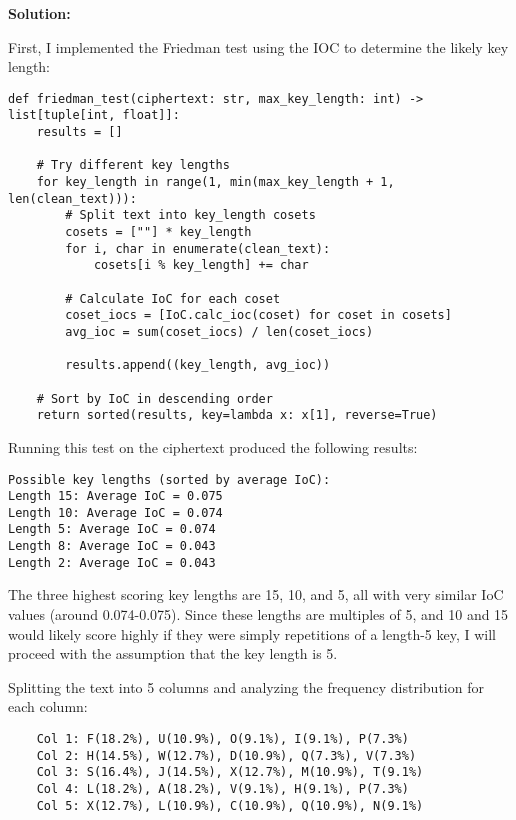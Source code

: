 \documentclass[12pt]{article}
\begin{document}
\vspace{1em}
\textbf{Solution:}

First, I implemented the Friedman test using the IOC to determine the likely key length:

\begin{lstlisting}[style=python]
def friedman_test(ciphertext: str, max_key_length: int) -> list[tuple[int, float]]:
    results = []

    # Try different key lengths
    for key_length in range(1, min(max_key_length + 1, len(clean_text))):
        # Split text into key_length cosets
        cosets = [""] * key_length
        for i, char in enumerate(clean_text):
            cosets[i % key_length] += char

        # Calculate IoC for each coset
        coset_iocs = [IoC.calc_ioc(coset) for coset in cosets]
        avg_ioc = sum(coset_iocs) / len(coset_iocs)

        results.append((key_length, avg_ioc))

    # Sort by IoC in descending order
    return sorted(results, key=lambda x: x[1], reverse=True)
\end{lstlisting}

Running this test on the ciphertext produced the following results:

\begin{verbatim}
Possible key lengths (sorted by average IoC):
Length 15: Average IoC = 0.075
Length 10: Average IoC = 0.074
Length 5: Average IoC = 0.074
Length 8: Average IoC = 0.043
Length 2: Average IoC = 0.043
\end{verbatim}

The three highest scoring key lengths are 15, 10, and 5, all with very similar IoC values (around 0.074-0.075). Since these lengths are multiples of 5, and 10 and 15 would likely score highly if they were simply repetitions of a length-5 key, I will proceed with the assumption that the key length is 5.

\vspace{1em}
Splitting the text into 5 columns and analyzing the frequency distribution for each column:
\begin{verbatim}
    Col 1: F(18.2%), U(10.9%), O(9.1%), I(9.1%), P(7.3%)
    Col 2: H(14.5%), W(12.7%), D(10.9%), Q(7.3%), V(7.3%)
    Col 3: S(16.4%), J(14.5%), X(12.7%), M(10.9%), T(9.1%)
    Col 4: L(18.2%), A(18.2%), V(9.1%), H(9.1%), P(7.3%)
    Col 5: X(12.7%), L(10.9%), C(10.9%), Q(10.9%), N(9.1%)
\end{verbatim}
    
\end{document}
